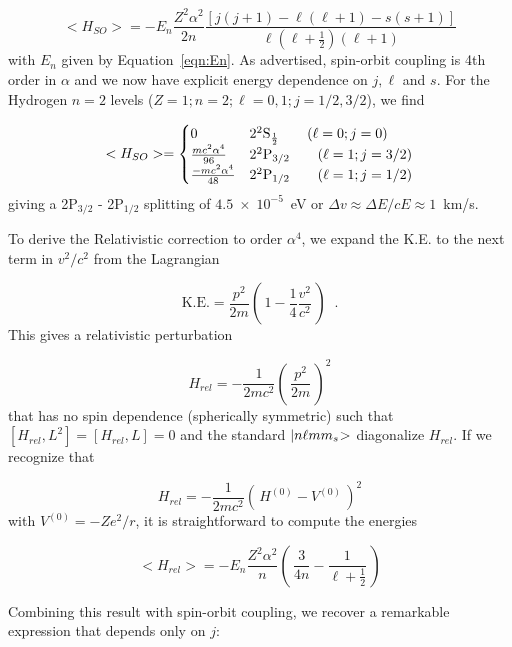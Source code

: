 \documentclass[graybox]{svmult}
\def\ohf{\frac{1}{2}}
\def\ket#1{{|#1\negmedspace>}}
\def\ltp{\left ( \,}
\def\rtp{\, \right  ) }
\def\sci#1{{\; \times \; 10^{#1}}}
\begin{document}
\begin{equation}
<H_{SO}> = -E_n \frac{Z^2 \alpha^2}{2n} \frac{[j(j+1) - 
\ell(\ell+1) - s(s+1)]}{\ell(\ell+\ohf)(\ell+1)}
\end{equation}
with $E_n$ given by Equation~\ref{eqn:En}.
As advertised, spin-orbit coupling is 4th order in $\alpha$
and we now have explicit energy dependence on $j,\ell$ and $s$.
For the Hydrogen $n=2$ levels ($Z=1; n=2; \ell = 0,1; j= 1/2, 3/2$),
we find

\begin{equation}
<H_{SO}> = 
  \begin{cases}
	0 &  2 ^2{\rm S}_\ohf \quad\quad (\ell = 0; j=0) \\
     \frac{mc^2 \alpha^4}{96} &  2 ^2{\rm P}_{3/2} \quad\quad (\ell=1; j=3/2) \\
     \frac{-mc^2 \alpha^4}{48} &  2 ^2{\rm P}_{1/2} \quad\quad (\ell=1; j=1/2) \\
  \end{cases}
\end{equation}
giving a 2P$_{3/2}$ - 2P$_{1/2}$ splitting of $4.5 \sci{-5}$~eV
or $\Delta v \approx \Delta E / cE \approx 1$~km/s.

To derive the Relativistic correction to order $\alpha^4$,
we expand the K.E. to the next term in $v^2/c^2$ from the Lagrangian

\begin{equation}
\text{K.E.} = \frac{p^2}{2m} \ltp 1 - \frac{1}{4} \frac{v^2}{c^2} \rtp \;\; .
\end{equation}
This gives a relativistic perturbation 

\begin{equation}
H_{rel} = -\frac{1}{2mc^2} \ltp \frac{p^2}{2m} \rtp^2
\end{equation}
that has no spin dependence (spherically symmetric)
such that $[H_{rel}, L^2] = [H_{rel}, L] = 0$
and the standard $\ket{n \ell m m_s}$ diagonalize $H_{rel}$.
If we recognize that

\begin{equation*}
H_{rel} = -\frac{1}{2mc^2} \ltp H^{(0)} - V^{(0)} \rtp^2
\end{equation*}
with $V^{(0)} = -Z e^2/r$, it is straightforward to
compute the energies

\begin{equation}
<H_{rel}> = -E_n \frac{Z^2 \alpha^2}{n} \ltp \frac{3}{4n} - \frac{1}{\ell + \ohf} \rtp
\end{equation}

Combining this result with spin-orbit coupling,
we recover a remarkable expression that depends only on $j$:
\end{document}
